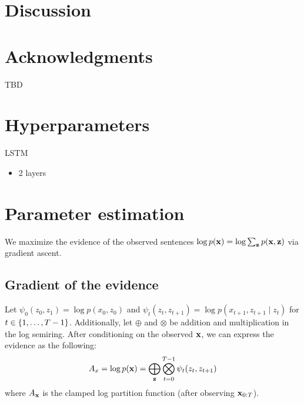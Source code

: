 \documentclass[11pt,a4paper]{article}
\begin{document}
\paragraph{}

\section{Discussion}


\section*{Acknowledgments}
TBD




\appendix

\section{Hyperparameters}
\label{sec:hyperparams}
LSTM
\begin{itemize}
\item 2 layers
\end{itemize}

\section{Parameter estimation}
We maximize the evidence of the observed sentences
$\log p(\mathbf{x}) = \log \sum_{\mathbf{z}} p(\mathbf{x}, \mathbf{z})$
via gradient ascent.

\subsection{Gradient of the evidence}
Let $\psi_0(z_0, z_1) = \log p(x_0, z_0)$ and
$\psi_t(z_{t}, z_{t+1}) = \log p(x_{t+1}, z_{t+1} \mid z_{t})$ for $t \in \left\{1, \ldots, T-1\right\}$.
Additionally, let $\oplus$ and $\otimes$ be addition and multiplication in the log semiring.
After conditioning on the observed $\mathbf{x}$, we can express the evidence as the following:
\begin{equation}
\label{eqn:evidence}
A_x = \log p(\mathbf{x}) = \bigoplus_{\mathbf{z}}\bigotimes_{t=0}^{T-1} \psi_t(z_t, z_{t+1})
\end{equation}
where $A_{\mathbf{x}}$ is the clamped log partition function (after observing $\mathbf{x}_{0:T}$).
\end{document}

